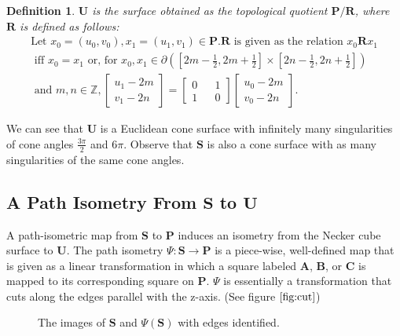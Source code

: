 \documentclass[]{article}
\newtheorem{Def}{Definition}[section]
\begin{document}
\begin{Def}{} $\mathbf U$ is the surface obtained as the topological quotient $\mathbf P/\mathbf R$, where $\mathbf R$ is defined as follows:
\begin{gather*}
\text{Let } x_{0}=(u_{0},v_{0}),x_{1}=(u_{1},v_{1}) \in \mathbf{P}.  \mathbf{ R} \text { is given as the relation } x_{0}\mathbf{R}x_{1} \\ \text{ iff } x_{0}=x_{1}
 \text{ or, for }x_{0},x_{1} \in {\partial} \left( \left[2m-\frac{1}{2},2m+\frac{1}{2}\right] \times \left[2n-\frac{1}{2},2n+\frac{1}{2}\right] \right)\\
 \text{ and }m,n\in\mathbb{Z},
  \left[\begin{array}{c}
u_{1} -2m
\\v_{1}-2n
\end{array}\right] = \left[\begin{matrix}
0 && 1\\
1 && 0
\end{matrix}\right]
\left[ \begin{array}{c}u_{0}-2m\\
v_{0}-2n
\end{array}\right]
. \end{gather*}
\end{Def}

We can see that $\mathbf{U}$ is a Euclidean cone surface with infinitely many singularities of cone angles $\frac{3\pi}{2}$ and $6\pi$. Observe that $\mathbf{S}$ is also a cone surface with as many singularities of the same cone angles.

\subsection{A Path Isometry From $\mathbf S$ to $\mathbf U$}
A path-isometric map from $\mathbf{S}$ to $\mathbf{P}$ induces an isometry from the Necker cube surface to $\mathbf{U}$. The path isometry $\Psi:\mathbf{S}\rightarrow\mathbf{P}$ is a piece-wise, well-defined map that is given as a linear transformation in which a square labeled $\mathbf{A}$, $\mathbf{B}$, or $\mathbf{C}$ is mapped to its corresponding square on $\mathbf{P}$. $\Psi$ is  essentially a transformation that cuts along the edges parallel with the z-axis. (See figure $\ref{fig:cut}$)

\begin{figure}[H]

\raisebox{0.4in}{}
\caption{The images of $\mathbf S$ and $\Psi(\mathbf{S})$ with edges identified.}
\label{fig:cut}
\end{figure}
\end{document}
